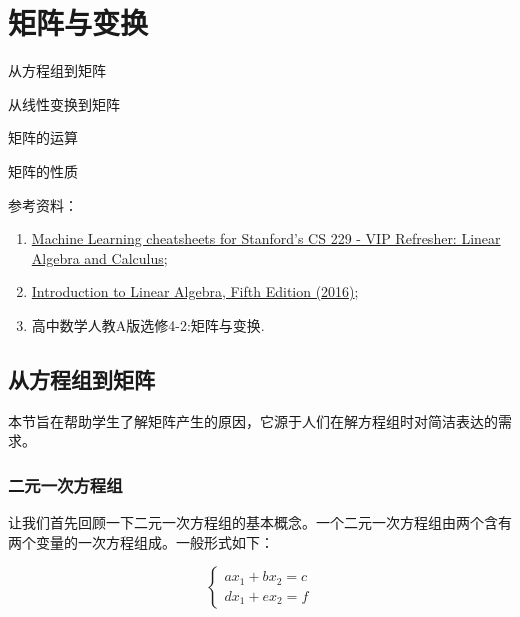 \chapter{矩阵与变换}

\begin{introduction}
  \item 从方程组到矩阵
  \item 从线性变换到矩阵
  \item 矩阵的运算
  \item 矩阵的性质
\end{introduction}

参考资料：
\begin{enumerate}
    \item \href{https://github.com/afshinea/stanford-cs-229-machine-learning/blob/master/zh/refresher-algebra-calculus.pdf}{Machine Learning cheatsheets for Stanford's CS 229 - VIP Refresher: Linear Algebra and Calculus};
    \item \href{https://math.mit.edu/~gs/linearalgebra/ila5/indexila5.html}{Introduction to Linear Algebra, Fifth Edition (2016)};
    \item 高中数学人教A版选修4-2:矩阵与变换.
\end{enumerate}

\section{从方程组到矩阵}
\label{sec:origin_of_matrix}

\begin{note}
本节旨在帮助学生了解矩阵产生的原因，它源于人们在解方程组时对简洁表达的需求。
\end{note}

\subsection{二元一次方程组}
\label{subsec:二元一次方程组}

让我们首先回顾一下二元一次方程组的基本概念。一个二元一次方程组由两个含有两个变量的一次方程组成。一般形式如下：

\begin{equation}
\left\{
\begin{array}{l}
ax_1 + bx_2 = c\\
dx_1 + ex_2 = f
\end{array}
\right.
\label{eq:二元一次方程组通式}
\end{equation}

